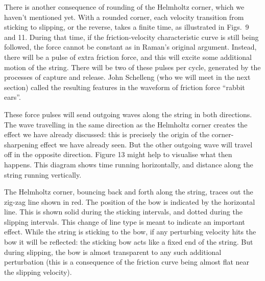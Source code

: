 


  There is another consequence of rounding of the Helmholtz corner, which we 
  haven’t mentioned yet. With a rounded corner, each velocity transition from 
  sticking to slipping, or the reverse, takes a finite time, as illustrated in 
  Figs.\ 9 and 11. During that time, if the friction-velocity characteristic 
  curve is still being followed, the force cannot be constant as in Raman's 
  original argument. Instead, there will be a pulse of extra friction force, 
  and this will excite some additional motion of the string. There will be two 
  of these pulses per cycle, generated by the processes of capture and release. 
  John Schelleng (who we will meet in the next section) called the resulting 
  features in the waveform of friction force “rabbit ears”. 

  These force pulses will send outgoing waves along the string in both 
  directions. The wave travelling in the same direction as the Helmholtz corner 
  creates the effect we have already discussed: this is precisely the origin of 
  the corner-sharpening effect we have already seen. But the other outgoing 
  wave will travel off in the opposite direction. Figure 13 might help to 
  visualise what then happens. This diagram shows time running horizontally, 
  and distance along the string running vertically. 


  The Helmholtz corner, bouncing back and forth along the string, traces out 
  the zig-zag line shown in red. The position of the bow is indicated by the 
  horizontal line. This is shown solid during the sticking intervals, and 
  dotted during the slipping intervals. This change of line type is meant to 
  indicate an important effect. While the string is sticking to the bow, if any 
  perturbing velocity hits the bow it will be reflected: the sticking bow acts 
  like a fixed end of the string. But during slipping, the bow is almost 
  transparent to any such additional perturbation (this is a consequence of the 
  friction curve being almost flat near the slipping velocity). 

